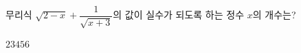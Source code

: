 \hspace*{2mm}\begin{minipage}[t]{\dimexpr\linewidth-2mm\relax}\vspace{0pt}
무리식 $\sqrt{2-x}+\dfrac{1}{\sqrt{x+3}}$의 값이 실수가 되도록 하는 정수 $x$의 개수는?
\begin{choices32}{$2$}{$3$}{$4$}{$5$}{$6$}\end{choices32}\end{minipage}

